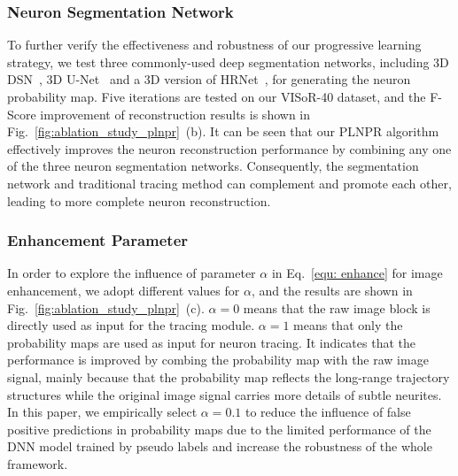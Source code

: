 \subsubsection{Neuron Segmentation Network}

To further verify the effectiveness and robustness of our progressive learning strategy, we test three commonly-used deep segmentation networks, including 3D DSN~\cite{Dou2017}, 3D U-Net~\cite{Cicek2016} and a 3D version of HRNet~\cite{Sun2019}, for generating the neuron probability map.
Five iterations are tested on our VISoR-40 dataset, and the F-Score improvement of reconstruction results is shown in Fig.~\ref{fig:ablation_study_plnpr}~(b). 
%
It can be seen that our PLNPR algorithm effectively improves the neuron reconstruction performance by combining any one of the three neuron segmentation networks.
Consequently, the segmentation network and traditional tracing method can complement and promote each other, leading to more complete neuron reconstruction.


\subsubsection{Enhancement Parameter} 

In order to explore the influence of parameter $\alpha$ in Eq.~\eqref{equ: enhance} for image enhancement, we adopt different values for $\alpha$, and the results are shown in Fig.~\ref{fig:ablation_study_plnpr}~(c).
$\alpha=0$ means that the raw image block is directly used as input for the tracing module.
$\alpha=1$ means that only the probability maps are used as input for neuron tracing. 
It indicates that the performance is improved by combing the probability map with the raw image signal, mainly because that the probability map reflects the long-range trajectory structures while the original image signal carries more details of subtle neurites.
In this paper, we empirically select $\alpha=0.1$ to reduce the influence of false positive predictions in probability maps due to the limited performance of the DNN model trained by pseudo labels and increase the robustness of the whole framework.

